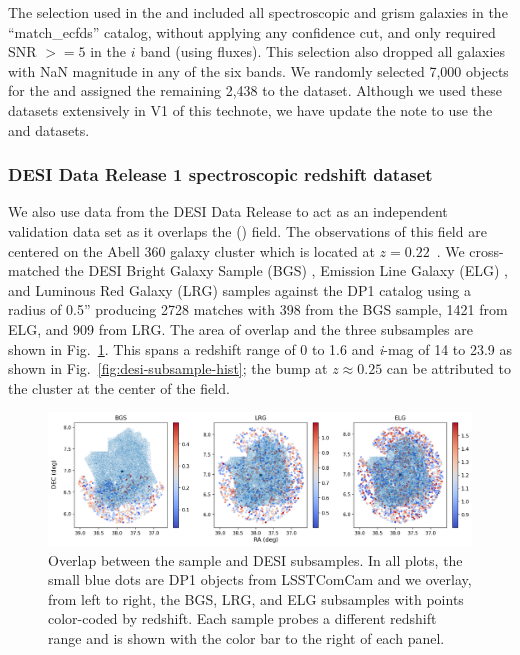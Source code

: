 The  selection used in the  and  
included all spectroscopic and grism galaxies in the ``match\_ecfds'' catalog, without applying 
any confidence cut, and only required SNR $>= 5$ in the $i$ band (using  fluxes).   
This selection also dropped all galaxies with NaN magnitude in any of the six bands.
We randomly selected 7,000 objects for the  and assigned the remaining 2,438 to the 
  dataset.  Although we used these datasets extensively in V1 of this technote, 
we have update the note to use the  and  datasets.


\subsubsection{DESI Data Release 1 spectroscopic redshift dataset}
\label{sec:data:desi}

We also use data from the DESI Data Release \citep{desi-dr1} to act as an independent validation data set as it overlaps the  () field.
The observations of this field are centered on the Abell 360 galaxy cluster which is located at $z=0.22$~\citep{A360z}.
We cross-matched the DESI Bright Galaxy Sample (BGS) \citep{BGS}, Emission Line Galaxy (ELG) \citep{ELG}, and Luminous Red Galaxy (LRG) \citep{LRG} samples against the DP1 catalog using a radius of 0.5'' producing 2728  matches with 398 from the BGS sample, 1421 from ELG, and 909 from LRG.
The area of overlap and the three subsamples are shown in Fig.~\ref{fig:desi-overlap}.
This spans a redshift range of 0 to 1.6 and \textit{i}-mag of 14 to 23.9 as shown in Fig.~\ref{fig:desi-subsample-hist}; the bump at $z\approx0.25$ can be attributed to the cluster at the center of the field.


\begin{figure}[ht]
    \centering
    \includegraphics[width=\linewidth]{figures/desi_sample_overlap.png}
    \caption{Overlap between the  sample and DESI subsamples. In all plots, the small blue dots are DP1 objects from LSSTComCam and we overlay, from left to right, the BGS, LRG, and ELG subsamples with points color-coded by redshift. Each sample probes a different redshift range and is shown with the color bar to the right of each panel.}
    \label{fig:desi-overlap}
\end{figure}


